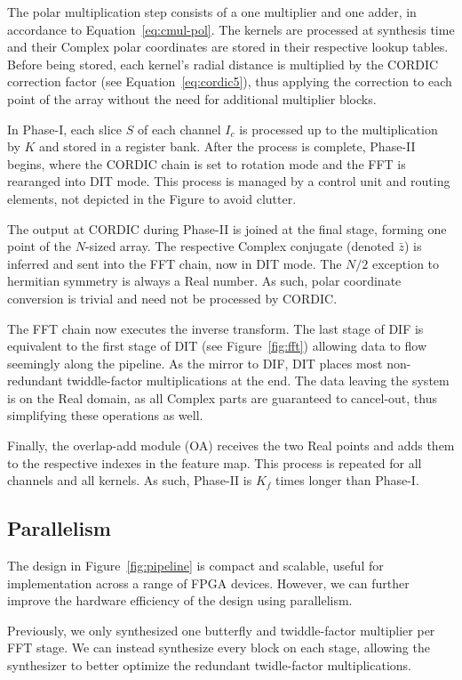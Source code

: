 \documentclass[
  10pt,
  \FORMAT-MODE,
  \REVIEW-MODE,
  \TWOSIDE-MODE
]{IEEEtran}
\begin{document}
    The polar multiplication step consists of a one multiplier and one adder, in accordance to Equation~\ref{eq:cmul-pol}. The kernels are processed at synthesis time and their Complex polar coordinates are stored in their respective lookup tables. Before being stored, each kernel's radial distance is multiplied by the CORDIC correction factor (see Equation~\ref{eq:cordic5}), thus applying the correction to each point of the array without the need for additional multiplier blocks.

    In Phase-I, each slice $S$ of each channel $I_c$ is processed up to the multiplication by $K$ and stored in a register bank. After the process is complete, Phase-II begins, where the CORDIC chain is set to rotation mode and the FFT is rearanged into DIT mode. This process is managed by a control unit and routing elements, not depicted in the Figure to avoid clutter.

    The output at CORDIC during Phase-II is joined at the final stage, forming one point of the $N$-sized array. The respective Complex conjugate (denoted $\bar{z}$) is inferred and sent into the FFT chain, now in DIT mode. The $N/2$ exception to hermitian symmetry is always a Real number. As such, polar coordinate conversion is trivial and need not be processed by CORDIC.
    
    The FFT chain now executes the inverse transform. The last stage of DIF is equivalent to the first stage of DIT (see Figure~\ref{fig:fft}) allowing data to flow seemingly along the pipeline. As the mirror to DIF, DIT places most non-redundant twiddle-factor multiplications at the end. The data leaving the system is on the Real domain, as all Complex parts are guaranteed to cancel-out, thus simplifying these operations as well.

    Finally, the overlap-add module (OA) receives the two Real points and adds them to the respective indexes in the feature map. This process is repeated for all channels and all kernels. As such, Phase-II is $K_f$ times longer than Phase-I.

  \subsection{Parallelism}
    The design in Figure~\ref{fig:pipeline} is compact and scalable, useful for implementation across a range of FPGA devices. However, we can further improve the hardware efficiency of the design using parallelism.

    Previously, we only synthesized one butterfly and twiddle-factor multiplier per FFT stage. We can instead synthesize every block on each stage, allowing the synthesizer to better optimize the redundant twidle-factor multiplications.
\end{document}
